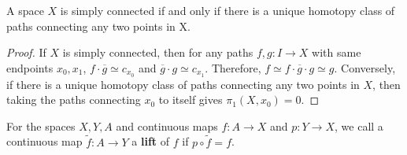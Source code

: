 \begin{prop} A space $X$ is simply connected if and only if there is a unique homotopy class of paths connecting any two points in X. 
\end{prop}
\begin{proof} If $X$ is simply connected, then for any paths $f,g:I\rightarrow X$ with same endpoints $x_0,x_1$, $f\cdot \overline{g}\simeq c_{x_0}$ and $\overline{g}\cdot g\simeq c_{x_1}$. Therefore, $f\simeq f\cdot \overline{g}\cdot g\simeq g$. Conversely, if there is a unique homotopy class of paths connecting any two points in $X$, then taking the paths connecting $x_0$ to itself gives $\pi_1(X,x_0)=0$.
\end{proof}

\begin{defn} For the spaces $X,Y,A$ and continuous maps $f:A\rightarrow X$ and $p:Y\rightarrow X$, we call a continuous map $\tilde{f}:A\rightarrow Y$ a \textbf{lift} of $f$ if $p\circ \tilde{f}=f$.
\end{defn}

